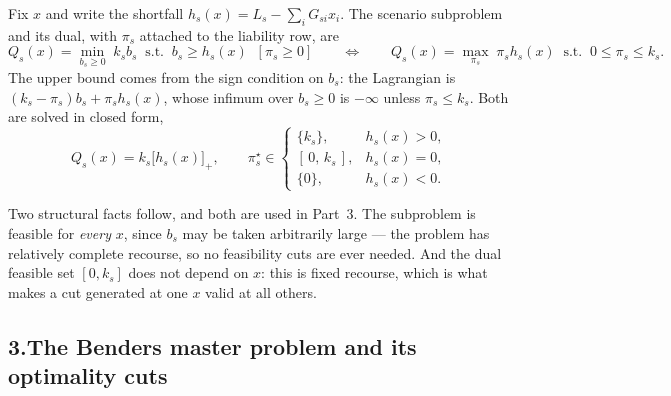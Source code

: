 \documentclass[11pt]{article}
\DeclareMathOperator*{\minimize}{min}
\DeclareMathOperator*{\maximize}{max}
\theoremstyle{definition}
\begin{document}
Fix $x$ and write the shortfall $h_s(x) = L_s - \sum_i G_{si} x_i$. The
scenario subproblem and its dual, with $\pi_s$ attached to the
liability row, are
\[
  Q_s(x) = \minimize_{b_s \ge 0}\; k_s b_s
    \;\;\text{s.t.}\;\; b_s \ge h_s(x) \;\;[\pi_s \ge 0]
  \qquad\Longleftrightarrow\qquad
  Q_s(x) = \maximize_{\pi_s}\; \pi_s h_s(x)
    \;\;\text{s.t.}\;\; 0 \le \pi_s \le k_s .
\]
The upper bound comes from the sign condition on $b_s$: the Lagrangian
is $(k_s - \pi_s) b_s + \pi_s h_s(x)$, whose infimum over $b_s \ge 0$
is $-\infty$ unless $\pi_s \le k_s$. Both are solved in closed form,
\begin{equation}\label{eq:p3sub}
  Q_s(x) = k_s \bigl[h_s(x)\bigr]_+,
  \qquad
  \pi_s^\star \in
  \begin{cases}
    \{k_s\}, & h_s(x) > 0,\\
    [\,0,\,k_s\,], & h_s(x) = 0,\\
    \{0\}, & h_s(x) < 0 .
  \end{cases}
\end{equation}

Two structural facts follow, and both are used in Part~3. The
subproblem is feasible for \emph{every} $x$, since $b_s$ may be taken
arbitrarily large --- the problem has relatively complete recourse, so
no feasibility cuts are ever needed. And the dual feasible set
$[0,k_s]$ does not depend on $x$: this is fixed recourse, which is what
makes a cut generated at one $x$ valid at all others.

\subsection*{3.\quad The Benders master problem and its optimality cuts}
\end{document}
